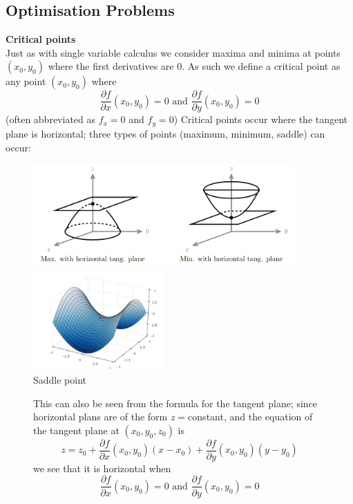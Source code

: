 \documentclass{report}
\begin{document}
\subsection{Optimisation Problems}%
\textbf{Critical points}\\
Just as with single variable calculus we consider maxima and minima at points $(x_0,y_0)$ where the first
derivatives are 0. As such we define a critical point as any point $(x_0,y_0)$ where
\begin{equation*}
\frac{\partial f}{\partial x}(x_0,y_0)=0\text{ and }
\frac{\partial f}{\partial y}(x_0,y_0)=0
\end{equation*}
(often abbreviated as $f_x=0$ and $f_y=0$) Critical points occur where the tangent plane is horizontal; three types
of points (maximum, minimum, saddle) can occur:
\begin{figure}[h]
\begin{center}
\includegraphics[width=10cm]{99}\\
\includegraphics[width=5cm]{100}\\
Saddle point
\end{center}
This can also be seen from the formula for the tangent plane; since horizontal plans are of the form $z=$constant, 
and the equation of the tangent plane at $(x_0,y_0,z_0)$ is
\begin{equation*}
z=z_0+\frac{\partial f}{\partial x}(x_0,y_0)(x-x_0)+
\frac{\partial f}{\partial y}(x_0,y_0)(y-y_0)
\end{equation*}
we see that it is horizontal when 
\begin{equation*}
\frac{\partial f}{\partial x}(x_0,y_0)=0\text{ and }
\frac{\partial f}{\partial y}(x_0,y_0)=0
\end{equation*}
\end{figure}
\end{document}
